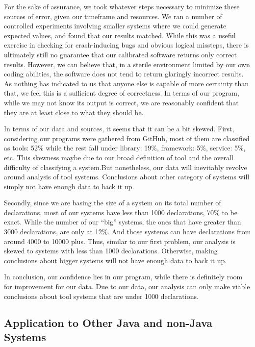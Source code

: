 \documentclass[12p]{article}
\begin{document}
For the sake of assurance, we took whatever steps necessary to minimize these sources of error, given our timeframe and resources. We ran a number of controlled experiments involving smaller systems where we could generate expected values, and found that our results matched. While this was a useful exercise in checking for crash-inducing bugs and obvious logical missteps, there is ultimately still no guarantee that our calibrated software returns only correct results. However, we can believe that, in a sterile environment limited by our own coding abilities, the software does not tend to return glaringly incorrect results. As nothing has indicated to us that anyone else is capable of more certainty than that, we feel this is a sufficient degree of correctness. In terms of our program, while we may not know its output  is correct, we are reasonably confident that they are at least close to what they should be.

In terms of our data and sources, it seems that it can be a bit skewed. First, considering our programs were gathered from GitHub, most of them are classified as tools: 52\% while the rest fall under library: 19\%, framework: 5\%, service: 5\%, etc. This skewness maybe due to our broad definition of tool and the overall difficulty of classifying a system.But nonetheless, our data will inevitably revolve around analysis of tool systems. Conclusions about other category of systems will simply not have enough data to back it up.

Secondly, since we are basing the size of a system on its total number of declarations, most of our systems have less than 1000 declarations, 70\% to be exact. While the number of our “big” systems, the ones that have greater than 3000 declarations, are only at 12\%. And those systems can have declarations from around 4000 to 10000 plus. Thus, similar to our first problem, our analysis is skewed to systems with less than 1000 declarations. Otherwise, making conclusions about bigger systems will not have enough data to back it up.

In conclusion, our confidence lies in our program, while there is definitely room for improvement for our data. Due to our data, our analysis can only make viable conclusions about tool systems that are under 1000 declarations.

\subsection{Application to Other Java and non-Java Systems}
\end{document}
